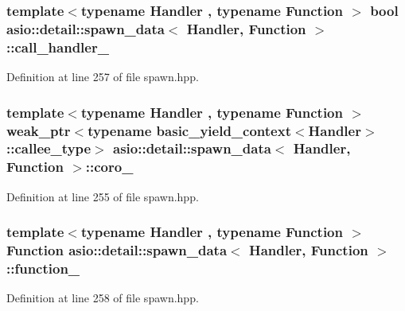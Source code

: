 \subsubsection[{call\+\_\+handler\+\_\+}]{\setlength{\rightskip}{0pt plus 5cm}template$<$typename Handler , typename Function $>$ bool {\bf asio\+::detail\+::spawn\+\_\+data}$<$ Handler, Function $>$\+::call\+\_\+handler\+\_\+}\label{structasio_1_1detail_1_1spawn__data_abb8049886da1a441474507f6790c3f14}


Definition at line 257 of file spawn.\+hpp.

\hypertarget{structasio_1_1detail_1_1spawn__data_a3d0b86a01a51c2dd0a92cf4dfedd4ce0}{}
\subsubsection[{coro\+\_\+}]{\setlength{\rightskip}{0pt plus 5cm}template$<$typename Handler , typename Function $>$ weak\+\_\+ptr$<$typename {\bf basic\+\_\+yield\+\_\+context}$<$Handler$>$\+::callee\+\_\+type$>$ {\bf asio\+::detail\+::spawn\+\_\+data}$<$ Handler, Function $>$\+::coro\+\_\+}\label{structasio_1_1detail_1_1spawn__data_a3d0b86a01a51c2dd0a92cf4dfedd4ce0}


Definition at line 255 of file spawn.\+hpp.

\hypertarget{structasio_1_1detail_1_1spawn__data_ab2f73b1edf9593c3f9eb72c80d5446a2}{}
\subsubsection[{function\+\_\+}]{\setlength{\rightskip}{0pt plus 5cm}template$<$typename Handler , typename Function $>$ Function {\bf asio\+::detail\+::spawn\+\_\+data}$<$ Handler, Function $>$\+::function\+\_\+}\label{structasio_1_1detail_1_1spawn__data_ab2f73b1edf9593c3f9eb72c80d5446a2}


Definition at line 258 of file spawn.\+hpp.

\hypertarget{structasio_1_1detail_1_1spawn__data_a9450f8cd517de26ccb775cdd8f0254e9}{}
